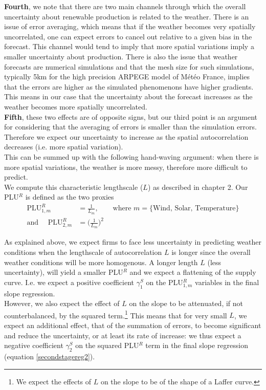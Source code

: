 \textbf{Fourth}, we note that there are two main channels through which the overall uncertainty about renewable production is related to the weather. There is an issue of error averaging, which means that if the weather becomes very spatially uncorrelated, one can expect errors to cancel out relative to a given bias in the forecast. This channel would tend to imply that more spatial variations imply a smaller uncertainty about production. There is also the issue that weather forecasts are numerical simulations and that the mesh size for such simulations, typically 5km for the high precision ARPEGE model of Météo France, implies that the errors are higher as the simulated phenomenons have higher gradients. This means in our case that the uncertainty about the forecast increases as the weather becomes more spatially uncorrelated. \\

\textbf{Fifth}, these two effects are of opposite signs, but our third point is an argument for considering that the averaging of errors is smaller than the simulation errors. Therefore we expect our uncertainty to increase as the spatial autocorrelation decreases (i.e. more spatial variation). \\

This can be summed up with the following hand-waving argument: when there is more spatial variations, the weather is more messy, therefore more difficult to predict. \\

We compute this characteristic lengthscale ($L$) as described in chapter 2. Our PLU$^R$ is defined as the two proxies 
\begin{align}
 \text{PLU}^R_{1,m} &= \frac{1}{L_m}, \quad \quad  \text{where } m=\{\text{Wind, Solar, Temperature}\} \\
  \text{and }  \quad \text{PLU}^R_{2,m} &=  \bigl(\frac{1}{L_m}\bigr)^2
\end{align}

As explained above, we expect firms to face less uncertainty in predicting weather conditions when the lengthscale of autocorrelation $L$ is longer since the overall weather conditions will be more homogenous. A longer length $L$ (less uncertainty), will yield a smaller PLU$^R$ and we expect a flattening of the supply curve. I.e. we expect a positive coefficient $\gamma^S_1$ on the PLU$^R_{1,m}$ variables in the final slope regression.\\

However, we also expect the effect of $L$ on the slope to be attenuated, if not counterbalanced, by the squared term.\footnote{We expect the effects of $L$ on the slope to be of the shape of a Laffer curve.} This means that for very small $L$, we expect an additional effect, that of the summation of errors, to become significant and reduce the uncertainty, or at least its rate of increase: we thus expect a negative coefficient $\gamma^S_2$ on the squared PLU$^R$ term in the final slope regression (equation \ref{secondstagereg2}). 

